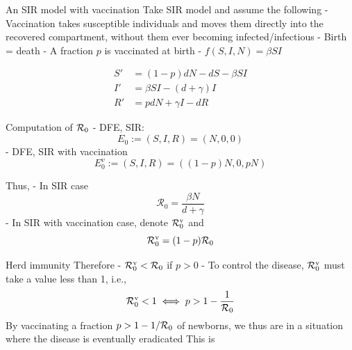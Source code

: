 \documentclass[aspectratio=43]{beamer}
\begin{document}
\begin{frame}{An SIR model with vaccination}
  Take SIR model and assume the following
  \vfill
- Vaccination takes susceptible individuals and moves them directly into the recovered compartment, without them ever becoming infected/infectious
\vfill
- Birth = death
\vfill
- A fraction $p$ is vaccinated at birth
\vfill
- $f(S,I,N)=\beta SI$

\end{frame}


\begin{frame}{}

  \begin{subequations}\label{sys:SIR_demog_vacc}
    \begin{align}
      S' &= (1-p)dN-dS-\beta SI \label{sys:SIR_demog_vacc_dS}\\
      I' &= \beta SI -(d+\gamma)I \label{sys:SIR_demog_vacc_dI}\\
      R' &= pdN+\gamma I-dR \label{sys:SIR_demog_vacc_dR}
      \end{align}        
  \end{subequations}
\end{frame}

\begin{frame}{Computation of $\mathcal{R}_0$}
  - DFE, SIR: 
  $$
  E_0:=(S,I,R)=(N,0,0)
  $$
  - DFE, SIR with vaccination
  $$
  E_0^v:=(S,I,R)=
  \left((1-p)N,0,pN\right)
  $$
  
  Thus,
  - In SIR case
  $$
  \mathcal{R}_0=\frac{\beta N}{d+\gamma}
  $$
  - In SIR with vaccination case, denote $\mathcal{R}_0^{\text{v}}$ and
  $$
  \mathcal{R}_0^{\text{v}}=(1-p)\mathcal{R}_0
  $$    
\end{frame}



\begin{frame}{Herd immunity}
  Therefore 
  - $\mathcal{R}_0^{\textrm{v}}<\mathcal{R}_0$ if $p>0$
  - To control the disease, $\mathcal{R}_0^{\text{v}}$ must take a value less than 1, i.e.,
  \begin{equation}
    \mathcal{R}_0^{\text{v}}<1 \iff p> 1-\frac{1}{\mathcal{R}_0}
  \end{equation}
  \vfill
  By vaccinating a fraction $p>1-1/\mathcal{R}_0$ of newborns, we thus are in a situation where the disease is eventually eradicated
  \vfill
  This is 
\end{frame}
\end{document}

